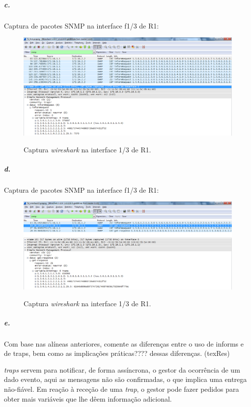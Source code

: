 \newpage

\subparagraph{c.}
Captura de pacotes SNMP na interface \textsf{f1/3} de \textsf{R1}:

\begin{figure}[h]
\centering
\includegraphics[width=1\textwidth, height=0.33\textheight]{7c.png}
\label{fig:12-capturaWireshark}
\caption{Captura \emph{wireshark} na interface \textsf{1/3} de \textsf{R1}.}
\end{figure}


\subparagraph{d.}
Captura de pacotes SNMP na interface \textsf{f1/3} de \textsf{R1}:

\begin{figure}[h]
\centering
\includegraphics[width=1\textwidth, height=0.3\textheight]{7d.png}
\label{fig:13-capturaWireshark}
\caption{Captura \emph{wireshark} na interface \textsf{1/3} de \textsf{R1}.}
\end{figure}


\subparagraph{e.}
Com base nas alíneas anteriores, comente as diferenças entre o uso de informs e de traps, bem como as implicações práticas???? dessas diferenças. (texRes)

\emph{traps} servem para notificar, de forma assíncrona, o gestor da ocorrência de um dado evento, aqui as mensagens não são confirmadas, o que implica uma entrega não-fiável. Em reação à receção de uma \emph{trap}, o gestor pode fazer pedidos para
obter mais variáveis que lhe dêem informação adicional.

